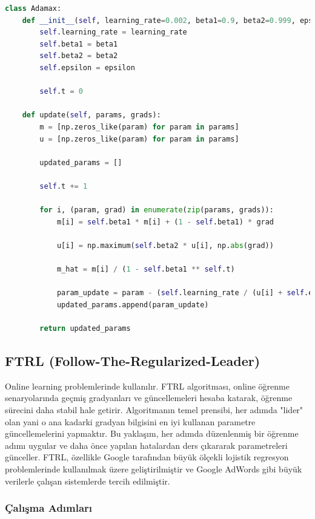 \begin{lstlisting}[language=Python]
class Adamax:
    def __init__(self, learning_rate=0.002, beta1=0.9, beta2=0.999, epsilon=1e-8):
        self.learning_rate = learning_rate
        self.beta1 = beta1
        self.beta2 = beta2
        self.epsilon = epsilon

        self.t = 0
    
    def update(self, params, grads):
        m = [np.zeros_like(param) for param in params]
        u = [np.zeros_like(param) for param in params]

        updated_params = []

        self.t += 1

        for i, (param, grad) in enumerate(zip(params, grads)):
            m[i] = self.beta1 * m[i] + (1 - self.beta1) * grad

            u[i] = np.maximum(self.beta2 * u[i], np.abs(grad))

            m_hat = m[i] / (1 - self.beta1 ** self.t)

            param_update = param - (self.learning_rate / (u[i] + self.epsilon)) * m_hat
            updated_params.append(param_update)

        return updated_params
\end{lstlisting}

\newpage

\subsection{FTRL (Follow-The-Regularized-Leader)}

Online learning problemlerinde kullanılır. FTRL algoritması, online öğrenme senaryolarında geçmiş gradyanları ve güncellemeleri hesaba katarak, öğrenme sürecini daha stabil hale getirir. Algoritmanın temel prensibi, her adımda "lider" olan yani o ana kadarki gradyan bilgisini en iyi kullanan parametre güncellemelerini yapmaktır. Bu yaklaşım, her adımda düzenlenmiş bir öğrenme adımı uygular ve daha önce yapılan hatalardan ders çıkararak parametreleri günceller.  FTRL, özellikle Google tarafından büyük ölçekli lojistik regresyon problemlerinde kullanılmak üzere geliştirilmiştir ve Google AdWords gibi büyük verilerle çalışan sistemlerde tercih edilmiştir. 

\subsubsection{Çalışma Adımları}

